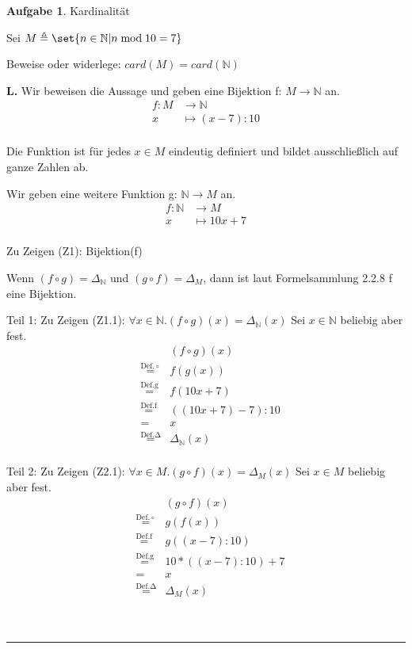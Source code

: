 \documentclass[10pt,leqno ]{article}
\DeclarePairedDelimiter\set\{\}
\newcommand\customeq[1]{\overset{\mathrm{#1}}{=}}
\theoremstyle{definition}
\newtheorem{problem}[theorem]{Aufgabe}
\newenvironment{solution}[1][L]{\begin{doublespace}\textbf{#1.}\quad }{\ \rule{0.5em}{0.5em}\end{doublespace}}
\begin{document}
\begin{problem}
Kardinalität

Sei \(M \triangleq \set{n \in \mathbb{N} | n \bmod 10 = 7}\)

Beweise oder widerlege: \(card(M) = card(\mathbb{N})\)
\end{problem}
\begin{solution}
Wir beweisen die Aussage und geben eine Bijektion f: \(M \rightarrow \mathbb{N}\) an.
\begin{align*}
    f: M &\rightarrow \mathbb{N} \\
    x &\mapsto (x - 7) : 10 \\ 
\end{align*}

Die Funktion ist für jedes \(x \in M\) eindeutig definiert und bildet ausschließlich auf ganze Zahlen ab.

Wir geben eine weitere Funktion g: \(\mathbb{N} \rightarrow M\) an.
\begin{align*}
    f: \mathbb{N} &\rightarrow M \\
    x &\mapsto 10x + 7 \\ 
\end{align*}

Zu Zeigen (Z1): Bijektion(f)

Wenn \((f \circ g) = \Delta_\mathbb{N} \) und \((g \circ f) = \Delta_M \), dann ist laut Formelsammlung 2.2.8 f eine Bijektion.

Teil 1: Zu Zeigen (Z1.1): \(\forall x \in \mathbb{N} . (f \circ g)(x) = \Delta_\mathbb{N}(x) \)
Sei \(x \in \mathbb{N}\) beliebig aber fest.
\begin{equation*}
    \begin{aligned}
    && (f \circ g)(x) \\
    & \customeq{Def. \circ} & f(g(x)) \\
    & \customeq{Def. g} & f(10x + 7) \\
    & \customeq{Def. f} & ((10x + 7) - 7) : 10 \\
    & = & x \\
    & \customeq{Def. \Delta} & \Delta_\mathbb{N}(x) \\
    \end{aligned}
\end{equation*}

Teil 2: Zu Zeigen (Z2.1):  \(\forall x \in M . (g \circ f)(x) = \Delta_M(x) \)
Sei \(x \in M\) beliebig aber fest.
\begin{equation*}
    \begin{aligned}
    && (g \circ f)(x) \\
    & \customeq{Def. \circ} & g(f(x)) \\
    & \customeq{Def. f} & g((x - 7) : 10) \\
    & \customeq{Def. g} & 10*((x-7):10) + 7 \\
    & = & x \\
    & \customeq{Def. \Delta} & \Delta_M(x) \\
    \end{aligned}
\end{equation*}


\end{solution}
\end{document}
